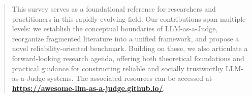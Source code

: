 \begin{abstract}
This survey serves as a foundational reference for researchers and practitioners in this rapidly evolving field. Our contributions span multiple levels: we establish the conceptual boundaries of LLM-as-a-Judge, reorganize fragmented literature into a unified framework, and propose a novel reliability-oriented benchmark. Building on these, we also articulate a forward-looking research agenda, offering both theoretical foundations and practical guidance for constructing reliable and socially trustworthy LLM-as-a-Judge systems.
The associated resources can be accessed at \textbf{\url{https://awesome-llm-as-a-judge.github.io/}}.
\end{abstract}







